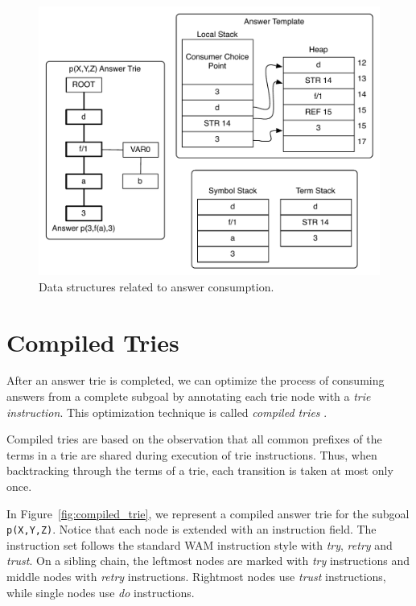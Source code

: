 \begin{figure}[h]
  \centering
    \includegraphics[scale=0.40]{consume_answer.pdf}
  \caption{Data structures related to answer consumption.}
  \label{fig:consume_answer}
\end{figure}

\section{Compiled Tries}\label{sec:compiled_tries}

After an answer trie is completed, we can optimize the process of consuming answers from a complete
subgoal by annotating each trie node with a \textit{trie instruction}. This optimization technique
is called \textit{compiled tries} \cite{RamakrishnanIV-99}.

Compiled tries are based on the observation that all common prefixes of the terms in a trie
are shared during execution of trie instructions. Thus, when backtracking
through the terms of a trie, each transition is taken at most only once.

In Figure~\ref{fig:compiled_trie}, we represent a compiled answer trie for the subgoal
\texttt{p(X,Y,Z)}. Notice that each node is extended with an instruction field.
The instruction set follows the standard WAM instruction style with \textit{try},
\textit{retry} and \textit{trust}. On a sibling chain, the leftmost nodes are marked
with \textit{try} instructions and middle nodes with \textit{retry} instructions. Rightmost
nodes use \textit{trust} instructions, while single nodes use \textit{do} instructions.

